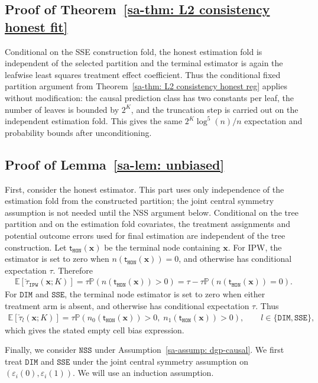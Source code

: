 \documentclass[10pt]{article}
\def\nodet{\mathsf{t}}
\def\bx{\mathbf{x}}
\def\E{\mathbb{E}}
\def\P{\mathbb{P}}
\def\DIM{\mathtt{DIM}}
\def\IPW{\mathtt{IPW}}
\def\SSE{\mathtt{SSE}}
\def\NSS{\mathtt{NSS}}
\theoremstyle{definition}
\theoremstyle{remark}
\begin{document}
\subsection{Proof of Theorem~\ref{sa-thm: L2 consistency honest fit}}

Conditional on the SSE construction fold, the honest estimation fold is independent of the selected partition and the terminal estimator is again the leafwise least squares treatment effect coefficient. Thus the conditional fixed partition argument from Theorem~\ref{sa-thm: L2 consistency honest reg} applies without modification: the causal prediction class has two constants per leaf, the number of leaves is bounded by $2^K$, and the truncation step is carried out on the independent estimation fold. This gives the same $2^K\log^5(n)/n$ expectation and probability bounds after unconditioning.

\subsection{Proof of Lemma~\ref{sa-lem: unbiased}}

First, consider the honest estimator. This part uses only independence of the estimation fold from the constructed partition; the joint central symmetry assumption is not needed until the NSS argument below. Conditional on the tree partition and on the estimation fold covariates, the treatment assignments and potential outcome errors used for final estimation are independent of the tree construction. Let $\nodet_{\mathtt{HON}}(\bx)$ be the terminal node containing $\bx$. For IPW, the estimator is set to zero when $n(\nodet_{\mathtt{HON}}(\bx))=0$, and otherwise has conditional expectation $\tau$. Therefore
\begin{align*}
    \E[\check{\tau}_{\IPW}(\bx;K)]
    = \tau \P(n(\nodet_{\mathtt{HON}}(\bx))>0)
    = \tau-\tau\P(n(\nodet_{\mathtt{HON}}(\bx))=0).
\end{align*}
For $\DIM$ and $\SSE$, the terminal node estimator is set to zero when either treatment arm is absent, and otherwise has conditional expectation $\tau$. Thus
\begin{align*}
    \E[\check{\tau}_{l}(\bx;K)]
    = \tau \P(n_0(\nodet_{\mathtt{HON}}(\bx))>0,\;n_1(\nodet_{\mathtt{HON}}(\bx))>0),
    \qquad l\in\{\DIM,\SSE\},
\end{align*}
which gives the stated empty cell bias expression.

Finally, we consider $\NSS$ under Assumption~\ref{sa-assump: dgp-causal}. We first treat $\DIM$ and $\SSE$ under the joint central symmetry assumption on $(\varepsilon_i(0),\varepsilon_i(1))$. We will use an induction assumption.
\end{document}
